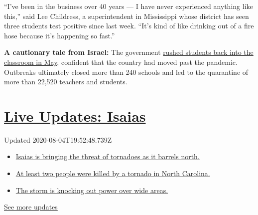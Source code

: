 ``I've been in the business over 40 years --- I have never experienced
anything like this,'' said Lee Childress, a superintendent in
Mississippi whose district has seen three students test positive since
last week. ``It's kind of like drinking out of a fire hose because it's
happening so fast.''

\textbf{A cautionary tale from Israel:} The government
\href{https://www.nytimes3xbfgragh.onion/2020/08/04/world/middleeast/coronavirus-israel-schools-reopen.html}{rushed
students back into the classroom in May}, confident that the country had
moved past the pandemic. Outbreaks ultimately closed more than 240
schools and led to the quarantine of more than 22,520 teachers and
students.

\hypertarget{live-updates-isaias}{%
\section{\texorpdfstring{\href{https://www.nytimes3xbfgragh.onion/2020/08/04/us/isaias-storm-updates.html?action=click\&pgtype=Article\&state=default\&region=MAIN_CONTENT_1\&context=storylines_live_updates}{Live
Updates: Isaias}}{Live Updates: Isaias}}\label{live-updates-isaias}}

Updated 2020-08-04T19:52:48.739Z

\begin{itemize}
\tightlist
\item
  \href{https://www.nytimes3xbfgragh.onion/2020/08/04/us/isaias-storm-updates.html?action=click\&pgtype=Article\&state=default\&region=MAIN_CONTENT_1\&context=storylines_live_updates\#link-362830dd}{Isaias
  is bringing the threat of tornadoes as it barrels north.}
\item
  \href{https://www.nytimes3xbfgragh.onion/2020/08/04/us/isaias-storm-updates.html?action=click\&pgtype=Article\&state=default\&region=MAIN_CONTENT_1\&context=storylines_live_updates\#link-7961bdbc}{At
  least two people were killed by a tornado in North Carolina.}
\item
  \href{https://www.nytimes3xbfgragh.onion/2020/08/04/us/isaias-storm-updates.html?action=click\&pgtype=Article\&state=default\&region=MAIN_CONTENT_1\&context=storylines_live_updates\#link-34e5d4e4}{The
  storm is knocking out power over wide areas.}
\end{itemize}

\href{https://www.nytimes3xbfgragh.onion/2020/08/04/us/isaias-storm-updates.html?action=click\&pgtype=Article\&state=default\&region=MAIN_CONTENT_1\&context=storylines_live_updates}{See
more updates}

